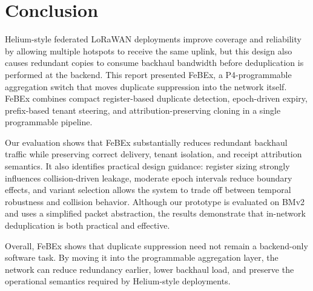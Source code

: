 
\section{Conclusion}
\label{sec:conclusion}

Helium-style federated LoRaWAN deployments improve coverage and reliability by allowing multiple hotspots to receive the same uplink, but this design also causes redundant copies to consume backhaul bandwidth before deduplication is performed at the backend. This report presented FeBEx, a P4-programmable aggregation switch that moves duplicate suppression into the network itself. FeBEx combines compact register-based duplicate detection, epoch-driven expiry, prefix-based tenant steering, and attribution-preserving cloning in a single programmable pipeline.

Our evaluation shows that FeBEx substantially reduces redundant backhaul traffic while preserving correct delivery, tenant isolation, and receipt attribution semantics. It also identifies practical design guidance: register sizing strongly influences collision-driven leakage, moderate epoch intervals reduce boundary effects, and variant selection allows the system to trade off between temporal robustness and collision behavior. Although our prototype is evaluated on BMv2 and uses a simplified packet abstraction, the results demonstrate that in-network deduplication is both practical and effective.

Overall, FeBEx shows that duplicate suppression need not remain a backend-only software task. By moving it into the programmable aggregation layer, the network can reduce redundancy earlier, lower backhaul load, and preserve the operational semantics required by Helium-style deployments. 



